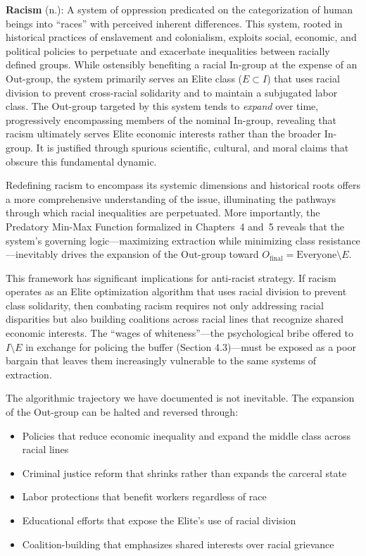 \documentclass[12pt,openany]{book}
\begin{document}
\begin{definition}
\textbf{Racism} (n.): A system of oppression predicated on the categorization of human beings into ``races'' with perceived inherent differences. This system, rooted in historical practices of enslavement and colonialism, exploits social, economic, and political policies to perpetuate and exacerbate inequalities between racially defined groups. While ostensibly benefiting a racial In-group at the expense of an Out-group, the system primarily serves an Elite class ($E \subset I$) that uses racial division to prevent cross-racial solidarity and to maintain a subjugated labor class. The Out-group targeted by this system tends to \textit{expand} over time, progressively encompassing members of the nominal In-group, revealing that racism ultimately serves Elite economic interests rather than the broader In-group. It is justified through spurious scientific, cultural, and moral claims that obscure this fundamental dynamic.
\end{definition}

Redefining racism to encompass its systemic dimensions and historical roots offers a more comprehensive understanding of the issue, illuminating the pathways through which racial inequalities are perpetuated. More importantly, the Predatory Min-Max Function formalized in Chapters~4 and~5 reveals that the system's governing logic---maximizing extraction while minimizing class resistance---inevitably drives the expansion of the Out-group toward $O_{\text{final}} = \text{Everyone} \setminus E$.

This framework has significant implications for anti-racist strategy. If racism operates as an Elite optimization algorithm that uses racial division to prevent class solidarity, then combating racism requires not only addressing racial disparities but also building coalitions across racial lines that recognize shared economic interests. The ``wages of whiteness''---the psychological bribe offered to $I \setminus E$ in exchange for policing the buffer (Section 4.3)---must be exposed as a poor bargain that leaves them increasingly vulnerable to the same systems of extraction.

The algorithmic trajectory we have documented is not inevitable. The expansion of the Out-group can be halted and reversed through:
\begin{itemize}
    \item Policies that reduce economic inequality and expand the middle class across racial lines
    \item Criminal justice reform that shrinks rather than expands the carceral state
    \item Labor protections that benefit workers regardless of race
    \item Educational efforts that expose the Elite's use of racial division
    \item Coalition-building that emphasizes shared interests over racial grievance
\end{itemize}
\end{document}
